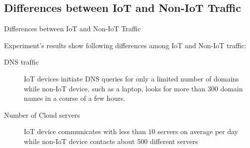 \documentclass[10pt]{beamer}
\begin{document}
\subsection{Differences between IoT and Non-IoT Traffic}
\begin{frame}{Differences between IoT and Non-IoT Traffic}

Experiment's results show following differences among IoT and Non-IoT traffic:

\begin{description}
\item[DNS trafﬁc] IoT devices initiate DNS queries for only a limited number of domains while non-IoT device, such as a laptop, looks for more than $300$ domain names in a course of a few hours.

\item[Number of Cloud servers] IoT device communicates with less than $10$ servers on average per day while non-IoT device contacts about $500$ different servers
\end{description}


\end{frame} 
\end{document}
